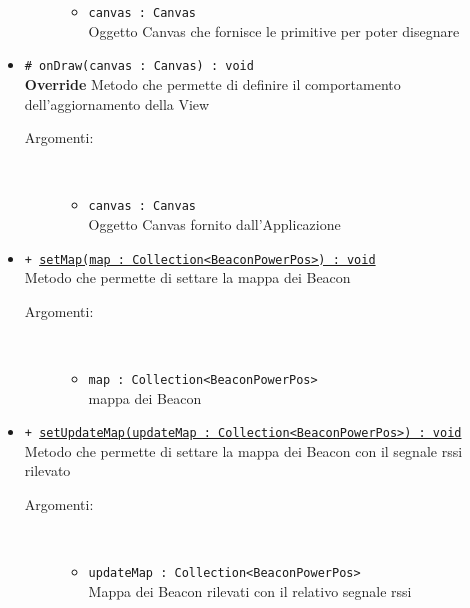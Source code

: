 \documentclass[../DefinizioneDiProdotto.tex]{subfiles}
\begin{document}
\begin{description}
\begin{itemize}
\begin{description}
			\begin{itemize}
				\item \texttt{canvas : Canvas}\\
				Oggetto Canvas che fornisce le primitive per poter disegnare\end{itemize}
		\end{description}
		\item \texttt{\# onDraw(canvas : Canvas) : void}\\
		\textbf{Override} Metodo che permette di definire il comportamento dell'aggiornamento della View
		\begin{description}
			\item[Argomenti:] \
			\begin{itemize}
				\item \texttt{canvas : Canvas}\\
				Oggetto Canvas fornito dall'Applicazione\end{itemize}
		\end{description}
		\item \texttt{+ \underline{setMap(map : Collection<BeaconPowerPos>) : void}}\\
		Metodo che permette di settare la mappa dei Beacon
		\begin{description}
			\item[Argomenti:] \
			\begin{itemize}
				\item \texttt{map : Collection<BeaconPowerPos>}\\
				mappa dei Beacon\end{itemize}
		\end{description}
		\item \texttt{+ \underline{setUpdateMap(updateMap : Collection<BeaconPowerPos>) : void}}\\
		Metodo che permette di settare la mappa dei Beacon con il segnale rssi rilevato
		\begin{description}
			\item[Argomenti:] \
			\begin{itemize}
				\item \texttt{updateMap : Collection<BeaconPowerPos>}\\
				Mappa dei Beacon rilevati con il relativo segnale rssi\end{itemize}
		\end{description}
	\end{itemize}
\end{description}
\end{document}
